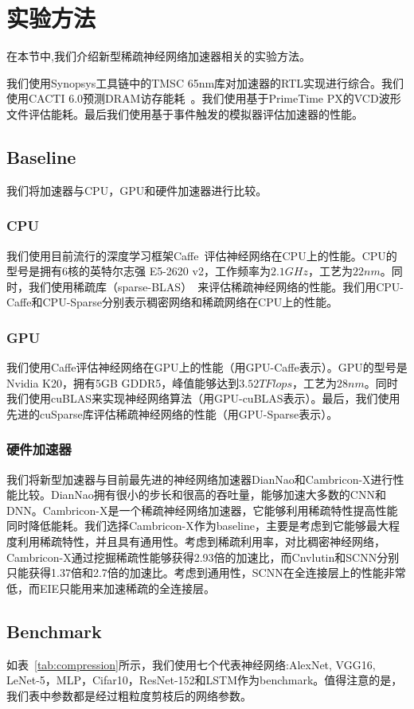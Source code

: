 \section{实验方法}
在本节中,我们介绍新型稀疏神经网络加速器相关的实验方法。

我们使用Synopsys工具链中的TMSC 65nm库对加速器的RTL实现进行综合。我们使用CACTI 6.0预测DRAM访存能耗~\cite{muralimanohar2007optimizing}。我们使用基于PrimeTime PX的VCD波形文件评估能耗。最后我们使用基于事件触发的模拟器评估加速器的性能。

\subsection{Baseline}
我们将加速器与CPU，GPU和硬件加速器进行比较。

\subsubsection{CPU}
我们使用目前流行的深度学习框架Caffe~\cite{jia2014caffe}评估神经网络在CPU上的性能。CPU的型号是拥有6核的英特尔志强 E5-2620 v2，工作频率为$2.1GHz$，工艺为$22nm$。同时，我们使用稀疏库（sparse-BLAS）~\cite{duff2002overview}来评估稀疏神经网络的性能。我们用CPU-Caffe和CPU-Sparse分别表示稠密网络和稀疏网络在CPU上的性能。

\subsubsection{GPU}
我们使用Caffe评估神经网络在GPU上的性能（用GPU-Caffe表示）。GPU的型号是Nvidia K20，拥有5GB GDDR5，峰值能够达到$3.52TFlops$，工艺为$28nm$。同时我们使用cuBLAS来实现神经网络算法（用GPU-cuBLAS表示）。最后，我们使用先进的cuSparse库评估稀疏神经网络的性能（用GPU-Sparse表示）。

\subsubsection{硬件加速器}
我们将新型加速器与目前最先进的神经网络加速器DianNao和Cambricon-X进行性能比较。DianNao拥有很小的步长和很高的吞吐量，能够加速大多数的CNN和DNN。Cambricon-X是一个稀疏神经网络加速器，它能够利用稀疏特性提高性能同时降低能耗。我们选择Cambricon-X作为baseline，主要是考虑到它能够最大程度利用稀疏特性，并且具有通用性。考虑到稀疏利用率，对比稠密神经网络，Cambricon-X通过挖掘稀疏性能够获得2.93倍的加速比，而Cnvlutin和SCNN分别只能获得1.37倍和2.7倍的加速比。考虑到通用性，SCNN在全连接层上的性能非常低，而EIE只能用来加速稀疏的全连接层。

\subsection{Benchmark}
如表~\ref{tab:compression}所示，我们使用七个代表神经网络:AlexNet, VGG16, LeNet-5，MLP，Cifar10，ResNet-152和LSTM作为benchmark。值得注意的是，我们表中参数都是经过粗粒度剪枝后的网络参数。

